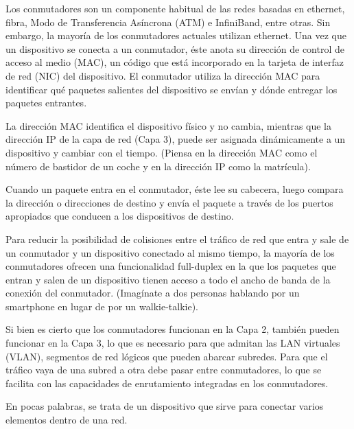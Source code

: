 \documentclass[a4paper, 12pt]{book}
\begin{document}
	Los conmutadores son un componente habitual de las redes basadas en ethernet, fibra, Modo de Transferencia Asíncrona (ATM) e InfiniBand, entre otras. Sin embargo, la mayoría de los conmutadores actuales utilizan ethernet. Una vez que un dispositivo se conecta a un conmutador, éste anota su dirección de control de acceso al medio (MAC), un código que está incorporado en la tarjeta de interfaz de red (NIC) del dispositivo. El conmutador utiliza la dirección MAC para identificar qué paquetes salientes del dispositivo se envían y dónde entregar los paquetes entrantes.
	
	La dirección MAC identifica el dispositivo físico y no cambia, mientras que la dirección IP de la capa de red (Capa 3), puede ser asignada dinámicamente a un dispositivo y cambiar con el tiempo. (Piensa en la dirección MAC como el número de bastidor de un coche y en la dirección IP como la matrícula).
	
	Cuando un paquete entra en el conmutador, éste lee su cabecera, luego compara la dirección o direcciones de destino y envía el paquete a través de los puertos apropiados que conducen a los dispositivos de destino.
	
	Para reducir la posibilidad de colisiones entre el tráfico de red que entra y sale de un conmutador y un dispositivo conectado al mismo tiempo, la mayoría de los conmutadores ofrecen una funcionalidad full-duplex en la que los paquetes que entran y salen de un dispositivo tienen acceso a todo el ancho de banda de la conexión del conmutador. (Imagínate a dos personas hablando por un smartphone en lugar de por un walkie-talkie).
	
	Si bien es cierto que los conmutadores funcionan en la Capa 2, también pueden funcionar en la Capa 3, lo que es necesario para que admitan las LAN virtuales (VLAN), segmentos de red lógicos que pueden abarcar subredes. Para que el tráfico vaya de una subred a otra debe pasar entre conmutadores, lo que se facilita con las capacidades de enrutamiento integradas en los conmutadores. 
	
	En pocas palabras, se trata de un dispositivo que sirve para conectar varios elementos dentro de una red.
	
	
	\cleardoublepage
\end{document}
